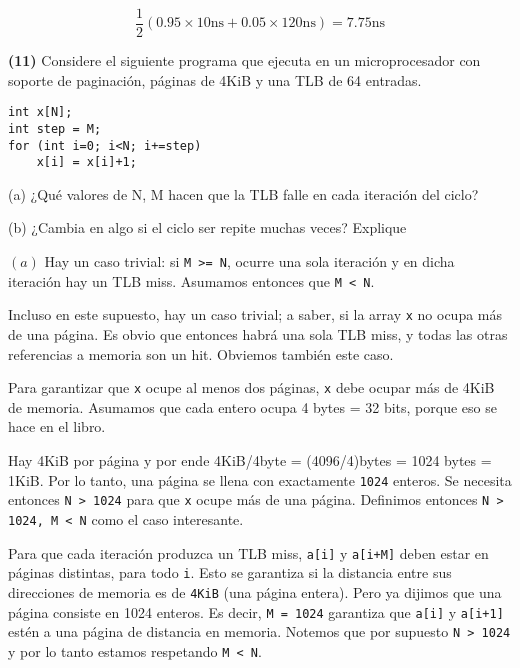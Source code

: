 \documentclass[12pt]{article}
\theoremstyle{definition}
\begin{document}
\begin{equation*}
    \frac{1}{2}( 0.95 \times 10\text{ns} + 0.05 \times 120\text{ns} ) = 7.75\text{ns}
\end{equation*}

\pagebreak

\begin{shaded}
    \textbf{(11)} Considere el siguiente programa que ejecuta en un
    microprocesador con soporte de paginación, páginas de 4KiB y una TLB de
    64 entradas.

\begin{lstlisting}[style=CStyle]
int x[N];
int step = M;
for (int i=0; i<N; i+=step)
    x[i] = x[i]+1;
\end{lstlisting}

(a) ¿Qué valores de N, M hacen que la TLB falle en cada iteración del ciclo?


(b) ¿Cambia en algo si el ciclo ser repite muchas veces? Explique
\end{shaded}

$(a)$ Hay un caso trivial: si \texttt{M >= N}, ocurre una sola iteración y en
dicha iteración hay un TLB miss. Asumamos entonces que \texttt{M < N}.

Incluso en este supuesto, hay un caso trivial; a saber, si la array \texttt{x}
no ocupa más de una página. Es obvio que entonces habrá una sola TLB miss, y
todas las otras referencias a memoria son un hit. Obviemos también este caso. 

Para garantizar que \texttt{x} ocupe al menos dos páginas, \texttt{x} debe
ocupar más de 4KiB de memoria. Asumamos que cada entero ocupa 4 bytes = 32 bits,
porque eso se hace en el libro. 

Hay 4KiB por página y por ende 4KiB/4byte = (4096/4)bytes = 1024 bytes = 1KiB.
Por lo tanto, una página se llena con exactamente \texttt{1024} enteros. Se
necesita entonces \texttt{N > 1024} para que \texttt{x} ocupe más de una página.
Definimos entonces \texttt{N > 1024, M < N} como el caso interesante.

Para que cada iteración produzca un TLB miss, \texttt{a[i]} y \texttt{a[i+M]}
deben estar en páginas distintas, para todo \texttt{i}. Esto se garantiza si la
distancia entre sus direcciones de memoria es de \texttt{4KiB} (una página
entera). Pero ya dijimos que una página consiste en 1024 enteros. Es decir,
\texttt{M = 1024} garantiza que \texttt{a[i]} y \texttt{a[i+1]} estén a una
página de distancia en memoria. Notemos que por supuesto \texttt{N > 1024} y por
lo tanto estamos respetando \texttt{M < N}.
\end{document}
